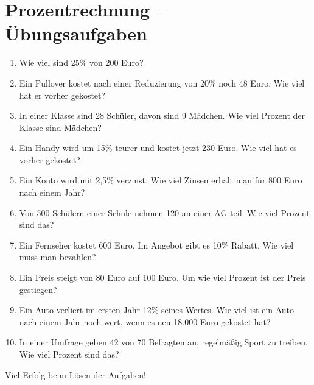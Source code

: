 
\section*{Prozentrechnung – Übungsaufgaben}

\begin{enumerate}
  \item Wie viel sind 25\% von 200 Euro?
  \item Ein Pullover kostet nach einer Reduzierung von 20\% noch 48 Euro. Wie viel hat er vorher gekostet?
  \item In einer Klasse sind 28 Schüler, davon sind 9 Mädchen. Wie viel Prozent der Klasse sind Mädchen?
  \item Ein Handy wird um 15\% teurer und kostet jetzt 230 Euro. Wie viel hat es vorher gekostet?
  \item Ein Konto wird mit 2,5\% verzinst. Wie viel Zinsen erhält man für 800 Euro nach einem Jahr?
  \item Von 500 Schülern einer Schule nehmen 120 an einer AG teil. Wie viel Prozent sind das?
  \item Ein Fernseher kostet 600 Euro. Im Angebot gibt es 10\% Rabatt. Wie viel muss man bezahlen?
  \item Ein Preis steigt von 80 Euro auf 100 Euro. Um wie viel Prozent ist der Preis gestiegen?
  \item Ein Auto verliert im ersten Jahr 12\% seines Wertes. Wie viel ist ein Auto nach einem Jahr noch wert, wenn es neu 18.000 Euro gekostet hat?
  \item In einer Umfrage geben 42 von 70 Befragten an, regelmäßig Sport zu treiben. Wie viel Prozent sind das?
\end{enumerate}

Viel Erfolg beim Lösen der Aufgaben!